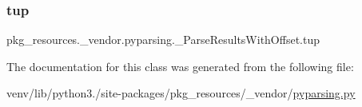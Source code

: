 \subsubsection{\texorpdfstring{tup}{tup}}
{\footnotesize\ttfamily pkg\+\_\+resources.\+\_\+vendor.\+pyparsing.\+\_\+\+Parse\+Results\+With\+Offset.\+tup}



The documentation for this class was generated from the following file\+:\begin{DoxyCompactItemize}
\item 
venv/lib/python3./site-\/packages/pkg\+\_\+resources/\+\_\+vendor/\hyperlink{pkg__resources_2__vendor_2pyparsing_8py}{pyparsing.\+py}\end{DoxyCompactItemize}
